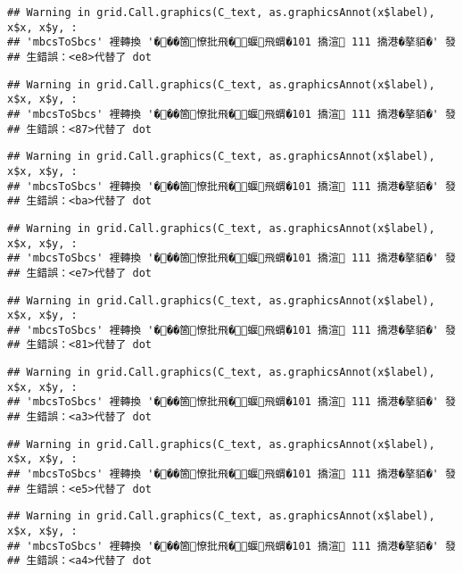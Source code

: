 \documentclass[
]{article}
\begin{document}
\begin{verbatim}
## Warning in grid.Call.graphics(C_text, as.graphicsAnnot(x$label), x$x, x$y, :
## 'mbcsToSbcs' 裡轉換 '���箇憭批飛�蝘飛蝟�101 撟渲 111 撟港�摮貊�' 發
## 生錯誤：<e8>代替了 dot
\end{verbatim}

\begin{verbatim}
## Warning in grid.Call.graphics(C_text, as.graphicsAnnot(x$label), x$x, x$y, :
## 'mbcsToSbcs' 裡轉換 '���箇憭批飛�蝘飛蝟�101 撟渲 111 撟港�摮貊�' 發
## 生錯誤：<87>代替了 dot
\end{verbatim}

\begin{verbatim}
## Warning in grid.Call.graphics(C_text, as.graphicsAnnot(x$label), x$x, x$y, :
## 'mbcsToSbcs' 裡轉換 '���箇憭批飛�蝘飛蝟�101 撟渲 111 撟港�摮貊�' 發
## 生錯誤：<ba>代替了 dot
\end{verbatim}

\begin{verbatim}
## Warning in grid.Call.graphics(C_text, as.graphicsAnnot(x$label), x$x, x$y, :
## 'mbcsToSbcs' 裡轉換 '���箇憭批飛�蝘飛蝟�101 撟渲 111 撟港�摮貊�' 發
## 生錯誤：<e7>代替了 dot
\end{verbatim}

\begin{verbatim}
## Warning in grid.Call.graphics(C_text, as.graphicsAnnot(x$label), x$x, x$y, :
## 'mbcsToSbcs' 裡轉換 '���箇憭批飛�蝘飛蝟�101 撟渲 111 撟港�摮貊�' 發
## 生錯誤：<81>代替了 dot
\end{verbatim}

\begin{verbatim}
## Warning in grid.Call.graphics(C_text, as.graphicsAnnot(x$label), x$x, x$y, :
## 'mbcsToSbcs' 裡轉換 '���箇憭批飛�蝘飛蝟�101 撟渲 111 撟港�摮貊�' 發
## 生錯誤：<a3>代替了 dot
\end{verbatim}

\begin{verbatim}
## Warning in grid.Call.graphics(C_text, as.graphicsAnnot(x$label), x$x, x$y, :
## 'mbcsToSbcs' 裡轉換 '���箇憭批飛�蝘飛蝟�101 撟渲 111 撟港�摮貊�' 發
## 生錯誤：<e5>代替了 dot
\end{verbatim}

\begin{verbatim}
## Warning in grid.Call.graphics(C_text, as.graphicsAnnot(x$label), x$x, x$y, :
## 'mbcsToSbcs' 裡轉換 '���箇憭批飛�蝘飛蝟�101 撟渲 111 撟港�摮貊�' 發
## 生錯誤：<a4>代替了 dot
\end{verbatim}
\end{document}
